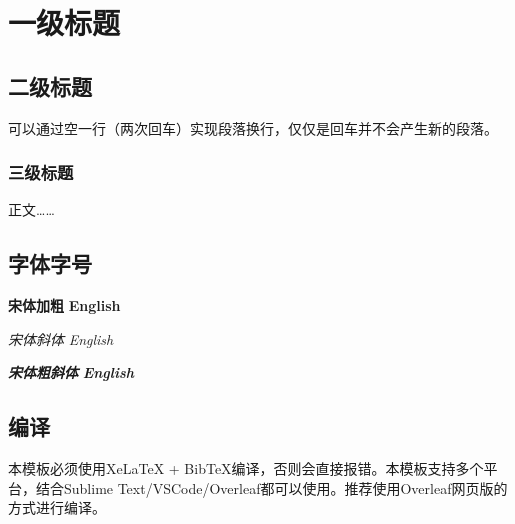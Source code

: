 %
%
%
%

\chapter{一级标题}

\section{二级标题}
可以通过空一行（两次回车）实现段落换行，仅仅是回车并不会产生新的段落\cite{yuFeiJiZongTiDuoXueKeSheJiYouHuaDeXianZhuangYuFaZhanFangXiang2008}。

\subsection{三级标题}

正文……\cite{simonyanVeryDeepConvolutional2015}

\section{字体字号}

{\songti \bfseries 宋体加粗} {\textbf{English}}

{\songti \itshape 宋体斜体} {\textit{English}}

{\songti \bfseries \itshape 宋体粗斜体} {\textbf{\textit{English}}}

\section{编译}

本模板必须使用XeLaTeX + BibTeX编译，否则会直接报错。本模板支持多个平台，结合Sublime Text/VSCode/Overleaf都可以使用。推荐使用Overleaf网页版的方式进行编译。


